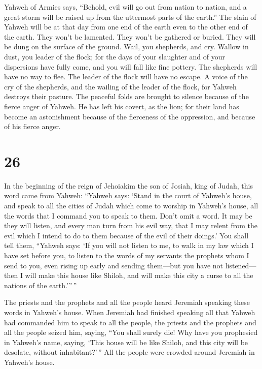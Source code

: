  Yahweh of Armies says, ``Behold, evil will go out from
nation to nation, and a great storm will be raised up from the uttermost
parts of the earth.''  The slain of Yahweh will be at that
day from one end of the earth even to the other end of the earth. They
won't be lamented. They won't be gathered or buried. They will be dung
on the surface of the ground.  Wail, you shepherds, and
cry. Wallow in dust, you leader of the flock; for the days of your
slaughter and of your dispersions have fully come, and you will fall
like fine pottery.  The shepherds will have no way to flee.
The leader of the flock will have no escape.  A voice of
the cry of the shepherds, and the wailing of the leader of the flock,
for Yahweh destroys their pasture.  The peaceful folds are
brought to silence because of the fierce anger of Yahweh. 
He has left his covert, as the lion; for their land has become an
astonishment because of the fierceness of the oppression, and because of
his fierce anger.

\hypertarget{section-25}{%
\section{26}\label{section-25}}

 In the beginning of the reign of Jehoiakim the son of
Josiah, king of Judah, this word came from Yahweh:  ``Yahweh
says: `Stand in the court of Yahweh's house, and speak to all the cities
of Judah which come to worship in Yahweh's house, all the words that I
command you to speak to them. Don't omit a word.  It may be
they will listen, and every man turn from his evil way, that I may
relent from the evil which I intend to do to them because of the evil of
their doings.'  You shall tell them, ``Yahweh says: `If you
will not listen to me, to walk in my law which I have set before you,
 to listen to the words of my servants the prophets whom I
send to you, even rising up early and sending them---but you have not
listened---  then I will make this house like Shiloh, and
will make this city a curse to all the nations of the earth.'''\,''

 The priests and the prophets and all the people heard
Jeremiah speaking these words in Yahweh's house.  When
Jeremiah had finished speaking all that Yahweh had commanded him to
speak to all the people, the priests and the prophets and all the people
seized him, saying, ``You shall surely die!  Why have you
prophesied in Yahweh's name, saying, `This house will be like Shiloh,
and this city will be desolate, without inhabitant?'\,'' All the people
were crowded around Jeremiah in Yahweh's house.

